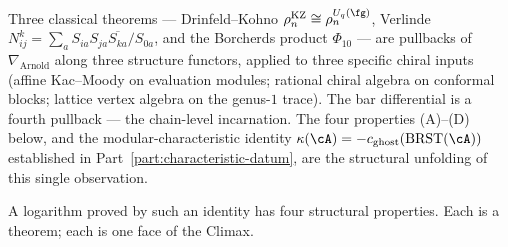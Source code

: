 Three classical theorems --- Drinfeld--Kohno
$\rho_{n}^{\mathrm{KZ}} \cong \rho_{n}^{U_{q}(\fg)}$,
Verlinde $N_{ij}^{k} = \sum_{a} S_{ia}S_{ja}\overline{S_{ka}}/S_{0a}$,
and the Borcherds product $\Phi_{10}$ --- are pullbacks of
$\nabla_{\mathrm{Arnold}}$ along three structure functors,
applied to three specific chiral inputs (affine Kac--Moody on
evaluation modules; rational chiral algebra on conformal blocks;
lattice vertex algebra on the genus-$1$ trace). The bar
differential is a fourth pullback --- the chain-level
incarnation. The four properties (A)--(D) below, and the
modular-characteristic identity
$\kappa(\cA) = -c_{\mathrm{ghost}}(\mathrm{BRST}(\cA))$ established
in Part~\ref{part:characteristic-datum}, are the structural
unfolding of this single observation.



\smallskip\noindent
A logarithm proved by such an identity has four structural
properties. Each is a theorem; each is one face of the Climax.
